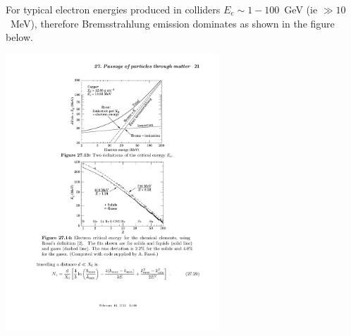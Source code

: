 For typical electron energies produced in colliders $E_{e}\sim 1-100$~GeV (ie $\gg10$~MeV), therefore Bremsstrahlung emission dominates as shown in the figure below.
\begin{center}
\includegraphics[width=0.6\textwidth]{fig/detector/e_energy_brem_vs_ion.pdf}
\end{center}

